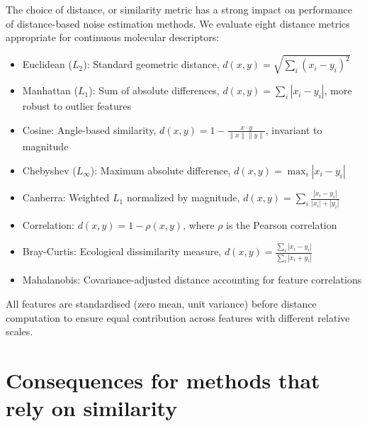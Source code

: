 The choice of distance, or similarity metric has a strong impact on performance of distance-based noise estimation methods. We evaluate eight distance metrics appropriate for continuous molecular descriptors:

\begin{itemize}
    \item Euclidean ($L_2$): Standard geometric distance, $d(x, y) = \sqrt{\sum_i (x_i - y_i)^2}$
    \item Manhattan ($L_1$): Sum of absolute differences, $d(x, y) = \sum_i |x_i - y_i|$, more robust to outlier features
    \item Cosine: Angle-based similarity, $d(x, y) = 1 - \frac{x \cdot y}{\|x\| \|y\|}$, invariant to magnitude
    \item Chebyshev ($L_\infty$): Maximum absolute difference, $d(x, y) = \max_i |x_i - y_i|$
    \item Canberra: Weighted $L_1$ normalized by magnitude, $d(x, y) = \sum_i \frac{|x_i - y_i|}{|x_i| + |y_i|}$
    \item Correlation: $d(x, y) = 1 - \rho(x, y)$, where $\rho$ is the Pearson correlation
    \item Bray-Curtis: Ecological dissimilarity measure, $d(x, y) = \frac{\sum_i |x_i - y_i|}{\sum_i |x_i + y_i|}$
    \item Mahalanobis: Covariance-adjusted distance accounting for feature correlations
\end{itemize}

All features are standardised (zero mean, unit variance) before distance computation to ensure equal contribution across features with different relative scales.



\section{Consequences for methods that rely on similarity}
%

